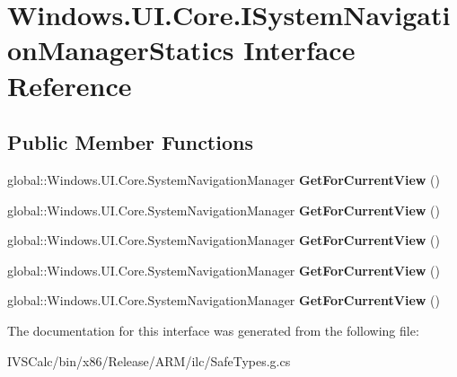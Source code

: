 \hypertarget{interface_windows_1_1_u_i_1_1_core_1_1_i_system_navigation_manager_statics}{}\section{Windows.\+U\+I.\+Core.\+I\+System\+Navigation\+Manager\+Statics Interface Reference}
\label{interface_windows_1_1_u_i_1_1_core_1_1_i_system_navigation_manager_statics}
\subsection*{Public Member Functions}
\begin{DoxyCompactItemize}
\item 
\mbox{\label{interface_windows_1_1_u_i_1_1_core_1_1_i_system_navigation_manager_statics_a0769b169b481a5719cd87498dcaccff1}} 
global\+::\+Windows.\+U\+I.\+Core.\+System\+Navigation\+Manager {\bfseries Get\+For\+Current\+View} ()
\item 
\mbox{\label{interface_windows_1_1_u_i_1_1_core_1_1_i_system_navigation_manager_statics_a0769b169b481a5719cd87498dcaccff1}} 
global\+::\+Windows.\+U\+I.\+Core.\+System\+Navigation\+Manager {\bfseries Get\+For\+Current\+View} ()
\item 
\mbox{\label{interface_windows_1_1_u_i_1_1_core_1_1_i_system_navigation_manager_statics_a0769b169b481a5719cd87498dcaccff1}} 
global\+::\+Windows.\+U\+I.\+Core.\+System\+Navigation\+Manager {\bfseries Get\+For\+Current\+View} ()
\item 
\mbox{\label{interface_windows_1_1_u_i_1_1_core_1_1_i_system_navigation_manager_statics_a0769b169b481a5719cd87498dcaccff1}} 
global\+::\+Windows.\+U\+I.\+Core.\+System\+Navigation\+Manager {\bfseries Get\+For\+Current\+View} ()
\item 
\mbox{\label{interface_windows_1_1_u_i_1_1_core_1_1_i_system_navigation_manager_statics_a0769b169b481a5719cd87498dcaccff1}} 
global\+::\+Windows.\+U\+I.\+Core.\+System\+Navigation\+Manager {\bfseries Get\+For\+Current\+View} ()
\end{DoxyCompactItemize}


The documentation for this interface was generated from the following file\+:\begin{DoxyCompactItemize}
\item 
I\+V\+S\+Calc/bin/x86/\+Release/\+A\+R\+M/ilc/Safe\+Types.\+g.\+cs\end{DoxyCompactItemize}
